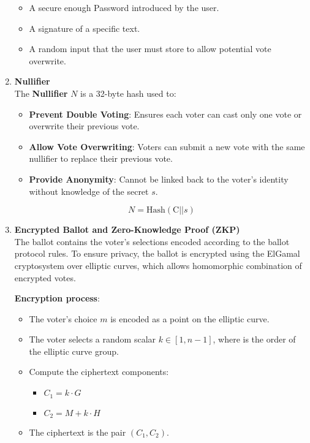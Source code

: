 \begin{enumerate}
			\begin{itemize}
				\item A secure enough Password introduced by the user.
				\item A signature of a specific text.
				\item A random input that the user must store to allow potential vote overwrite.\\
			\end{itemize}
	
	\item \textbf{Nullifier} \\
	
			The \textbf{Nullifier} $N$ is a 32-byte hash used to:
			
			\begin{itemize}
				\item \textbf{Prevent Double Voting}: Ensures each voter can cast only one vote or overwrite their previous vote.
				\item \textbf{Allow Vote Overwriting}: Voters can submit a new vote with the same nullifier to replace their previous vote.
				\item \textbf{Provide Anonymity}: Cannot be linked back to the voter's identity without knowledge of the secret $s$.
			\end{itemize}
		
			$$ N = \text{Hash}(\text{C} || s) $$ 
			
	\item \textbf{Encrypted Ballot and Zero-Knowledge Proof (ZKP)} \\
	
			The ballot contains the voter's selections encoded according to the ballot protocol rules. To ensure privacy, the ballot is encrypted using the ElGamal cryptosystem over elliptic curves, which allows homomorphic combination of encrypted votes.
			
			\textbf{Encryption process}:
			
			\begin{itemize}
				\item The voter's choice $m$ is encoded as a point on the elliptic curve.
				\item The voter selects a random scalar $k \in [1, n-1]$, where is the order of the elliptic curve group.
				\item Compute the ciphertext components:
					\begin{itemize}
						\item $C_1 = k \cdot G$
						\item $C_2 = M + k \cdot H$
					\end{itemize}
				\item The ciphertext is the pair $(C_1, C_2)$.
			\end{itemize}



\end{enumerate}
